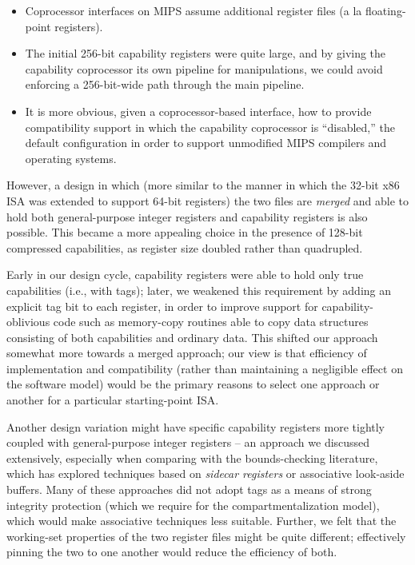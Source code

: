 \begin{itemize}
\item Coprocessor interfaces on MIPS assume additional
  register files (a la floating-point registers).
\item The initial 256-bit capability registers were quite large, and by giving the capability
  coprocessor its own pipeline for manipulations, we could avoid enforcing a
  256-bit-wide path through the main pipeline.
\item It is more obvious, given a coprocessor-based interface, how to provide
  compatibility support in which the capability coprocessor is ``disabled,''
  the default configuration in order to support unmodified MIPS compilers and
  operating systems.
\end{itemize}

\noindent
However, a design in
which (more similar to the manner in which the 32-bit x86 ISA was extended to
support 64-bit registers) the two files are \textit{merged} and able to hold
both general-purpose integer registers and capability registers is
also possible.
This became a more appealing choice in the presence of 128-bit compressed
capabilities, as register size doubled rather than quadrupled.

Early in our design cycle, capability registers were able to hold only true
capabilities (i.e., with tags); later, we weakened this requirement by adding
an explicit tag bit to each register, in order to improve support for
capability-oblivious code such as memory-copy routines able to copy data
structures consisting of both capabilities and ordinary data.
This shifted our approach somewhat more towards a merged approach; our view
is that efficiency of implementation and compatibility (rather than
maintaining a negligible
effect on the software model) would be the primary reasons to select one
approach or another for a particular starting-point ISA.

Another design variation might have specific capability registers
more tightly coupled with general-purpose integer registers -- an approach we discussed
extensively, especially when comparing with the bounds-checking literature,
which has explored techniques based on {\em sidecar registers} or associative
look-aside buffers.
Many of these approaches did not adopt tags as a means of strong integrity
protection (which we require for the compartmentalization model), which
would make associative techniques less suitable.
Further, we felt that the working-set properties of the two register files
might be quite different; effectively pinning the two to one another would
reduce the efficiency of both.

